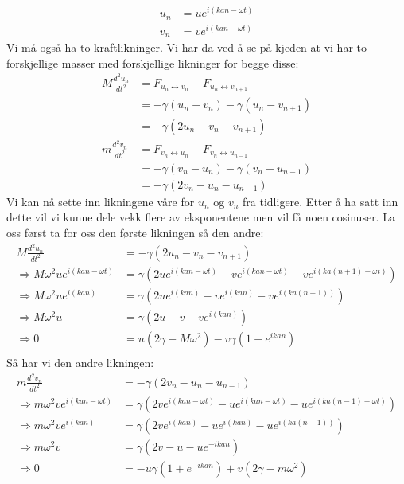 \documentclass{article}
\begin{document}
\begin{align}
    \label{eq:diatomisk_kjede_ansatz}
    u_n &= u e^{i (kan - \omega t)} \\
    v_n &= v e^{i (kan - \omega t)}
\end{align}
Vi må også ha to kraftlikninger. Vi har da ved å se på kjeden at vi har to forskjellige masser med forskjellige likninger for begge disse:
\begin{align}
    M \frac{d^2 u_n}{dt^2} &= F_{u_n \leftrightarrow v_n} + F_{u_n \leftrightarrow v_{n+1}}\\
                           &= -\gamma( u_n - v_n) -\gamma( u_n - v_{n+1}) \\
                           &= -\gamma(2u_n - v_{n} - v_{n+1}) \\
    m \frac{d^2 v_n}{dt^2} &= F_{v_n \leftrightarrow u_n} + F_{v_n \leftrightarrow u_{n-1}}\\
                           &= -\gamma( v_n - u_n) -\gamma( v_n - u_{n-1}) \\
                           &= -\gamma(2v_n - u_{n} - u_{n-1})
\end{align}
Vi kan nå sette inn likningene våre for $u_n$ og $v_n$ fra tidligere. Etter å ha satt inn dette vil vi kunne dele vekk flere av eksponentene men vil få noen cosinuser. La oss først ta for oss den første likningen så den andre:
\begin{align}
    M \frac{d^2 u_n}{dt^2} &= -\gamma(2u_n - v_{n} - v_{n+1})\\
    \Rightarrow M \omega^2 u e^{i(kan - \omega t)} &= \gamma\left(2 u e^{i(kan - \omega t)} - v e^{i(kan - \omega t)} - v e^{i(ka(n+1) - \omega t)}\right) \\
    \Rightarrow M \omega^2 u e^{i(kan)} &= \gamma\left(2 u e^{i(kan)} - v e^{i(kan)} - v e^{i(ka(n+1))}\right) \\
    \Rightarrow M \omega^2 u  &= \gamma\left(2 u - v  - v e^{i(kan)}\right) \\
    \Rightarrow 0 &= u (2 \gamma - M \omega^2) - v \gamma (1 + e^{i kan}) \\
\end{align}
Så har vi den andre likningen:
\begin{align}
    m \frac{d^2 v_n}{dt^2} &= -\gamma(2v_n - u_{n} - u_{n-1})\\
\Rightarrow m \omega^2 v e^{i(kan - \omega t)} &= \gamma\left(2 v e^{i(kan - \omega t)} - u e^{i(kan - \omega t)} - u e^{i(ka(n-1) - \omega t)}\right) \\
\Rightarrow m \omega^2 v e^{i(kan)} &= \gamma\left(2 v e^{i(kan)} - u e^{i(kan)} - u e^{i(ka(n-1))}\right) \\
\Rightarrow m \omega^2 v &= \gamma ( 2v - u - u e^{-ikan})\\
\Rightarrow 0 &= -u \gamma(1 + e^{-ikan}) + v (2\gamma - m \omega^2 )  
\end{align}
\end{document}
